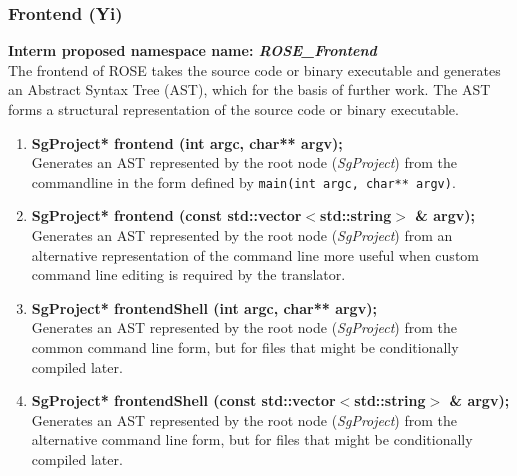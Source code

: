 \subsubsection{Frontend (Yi)}
{\bf Interm proposed namespace name: {\em ROSE\_Frontend}} \\
    The frontend of ROSE takes the source code or binary executable 
and generates an Abstract Syntax Tree (AST), which for the basis of 
further work. The AST forms a structural representation of the source
code or binary executable.
\begin{enumerate}
   \item {\bf SgProject* frontend (int argc, char** argv);} \\
   Generates an AST represented by the root node ({\em SgProject}) from
   the commandline in the form defined by {\tt main(int argc, char** argv)}.

   \item {\bf SgProject* frontend (const std::vector$<$std::string$>$ \& argv);} \\
   Generates an AST represented by the root node ({\em SgProject}) from
   an alternative representation of the command line more useful when 
   custom command line editing is required by the translator.

   \item {\bf SgProject* frontendShell (int argc, char** argv);} \\
   Generates an AST represented by the root node ({\em SgProject}) from
   the common command line form, but for files that might be conditionally 
   compiled later.

   \item {\bf SgProject* frontendShell (const std::vector$<$std::string$>$ \& argv);} \\
   Generates an AST represented by the root node ({\em SgProject}) from
   the alternative command line form, but for files that might be conditionally 
   compiled later.
\end{enumerate}

